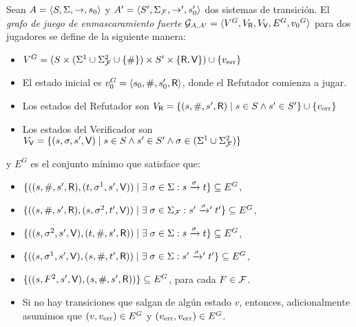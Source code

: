 \begin{definition} \label{def:strong_masking_game_graph}
  Sean $A=\langle S, \Sigma, \rightarrow, s_0 \rangle$ y $A'=\langle S',
  \Sigma_{\mathcal{F}}, \rightarrow', s'_0 \rangle$ dos sistemas de transición.
  El \emph{grafo de juego de enmascaramiento fuerte} 
  $\mathcal{G}_{A, A'} = \langle V^G, V_{\mathsf{R}}, V_{\mathsf{V}}, E^G, {v_0}^G \rangle$ 
  para dos jugadores se define de la siguiente manera:

\begin{itemize}
  \item $V^G = (S \times ( \Sigma^1 \cup \Sigma_{\mathcal{F}}^2 \cup\{\#\}) \times S' \times \{ \mathsf{R}, \mathsf{V} \}) 
  \cup \{v_{\text{err}}\}$
  \item El estado inicial es $v_0^G = \langle s_0, \#, s'_0, \mathsf{R} \rangle$, donde el Refutador comienza a jugar.
  \item Los estados del Refutador son $V_{\mathsf{R}} = \{ (s, \#, s', \mathsf{R}) \mid s \in S \wedge s' \in S' \} 
  \cup \{v_{\text{err}}\}$
  \item Los estados del Verificador son $V_{\mathsf{V}} = \{ (s, \sigma, s', \mathsf{V}) \mid s \in S \wedge s' \in S' \wedge \sigma \in ( \Sigma^1 \cup \Sigma_{\mathcal{F}}^2 )\}$
\end{itemize}
y $E^G$ es el conjunto mínimo que satisface que:
\begin{itemize}
  \item $\{ ( (s, \#, s', \mathsf{R}) , (t, \sigma^{1}, s', \mathsf{V})) \mid \exists\;\sigma \in \Sigma: s \xrightarrow{\sigma} t \} \subseteq E^G$,

  \item $\{ ((s, \#, s', \mathsf{R}), (s, \sigma^{2}, t', \mathsf{V}))  \mid \exists\;\sigma \in \Sigma_{\mathcal{F}}: s' \mathrel{{\xrightarrow[]{\sigma}}{}'} t' \} \subseteq E^G$,

  \item $\{ ((s, \sigma^2, s', \mathsf{V}), (t, \#, s', \mathsf{R})) \mid \exists\;\sigma \in \Sigma: s \xrightarrow{\sigma} t \} \subseteq E^G$,

  \item $\{ ((s, \sigma^1, s', \mathsf{V}), (s, \#, t', \mathsf{R})) \mid \exists\;\sigma \in \Sigma: s' \mathrel{{\xrightarrow[]{\sigma}}{}'} t' \} \subseteq E^G$,

  \item $\{ ((s, F^2, s', \mathsf{V}), (s, \#, s', \mathsf{R})) \} \subseteq E^G$, para cada $F \in \mathcal{F}$. 

  \item Si no hay transiciones que salgan de algún estado $v$, entonces, adicionalmente asumimos que $(v, v_{\text{err}}) \in E^G$ y $(v_{\text{err}}, v_{\text{err}}) \in E^G$.
\end{itemize}

\end{definition}


